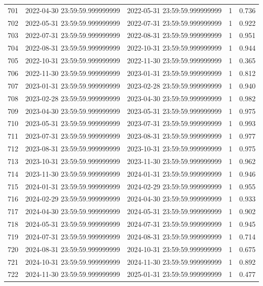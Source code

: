 \begin{table}
\begin{tabular}{lcccc}
701 & 2022-04-30 23:59:59.999999999 & 2022-05-31 23:59:59.999999999 & 1 & 0.736 \\
702 & 2022-05-31 23:59:59.999999999 & 2022-07-31 23:59:59.999999999 & 1 & 0.922 \\
703 & 2022-07-31 23:59:59.999999999 & 2022-08-31 23:59:59.999999999 & 1 & 0.951 \\
704 & 2022-08-31 23:59:59.999999999 & 2022-10-31 23:59:59.999999999 & 1 & 0.944 \\
705 & 2022-10-31 23:59:59.999999999 & 2022-11-30 23:59:59.999999999 & 1 & 0.365 \\
706 & 2022-11-30 23:59:59.999999999 & 2023-01-31 23:59:59.999999999 & 1 & 0.812 \\
707 & 2023-01-31 23:59:59.999999999 & 2023-02-28 23:59:59.999999999 & 1 & 0.940 \\
708 & 2023-02-28 23:59:59.999999999 & 2023-04-30 23:59:59.999999999 & 1 & 0.982 \\
709 & 2023-04-30 23:59:59.999999999 & 2023-05-31 23:59:59.999999999 & 1 & 0.975 \\
710 & 2023-05-31 23:59:59.999999999 & 2023-07-31 23:59:59.999999999 & 1 & 0.993 \\
711 & 2023-07-31 23:59:59.999999999 & 2023-08-31 23:59:59.999999999 & 1 & 0.977 \\
712 & 2023-08-31 23:59:59.999999999 & 2023-10-31 23:59:59.999999999 & 1 & 0.975 \\
713 & 2023-10-31 23:59:59.999999999 & 2023-11-30 23:59:59.999999999 & 1 & 0.962 \\
714 & 2023-11-30 23:59:59.999999999 & 2024-01-31 23:59:59.999999999 & 1 & 0.946 \\
715 & 2024-01-31 23:59:59.999999999 & 2024-02-29 23:59:59.999999999 & 1 & 0.955 \\
716 & 2024-02-29 23:59:59.999999999 & 2024-04-30 23:59:59.999999999 & 1 & 0.933 \\
717 & 2024-04-30 23:59:59.999999999 & 2024-05-31 23:59:59.999999999 & 1 & 0.902 \\
718 & 2024-05-31 23:59:59.999999999 & 2024-07-31 23:59:59.999999999 & 1 & 0.945 \\
719 & 2024-07-31 23:59:59.999999999 & 2024-08-31 23:59:59.999999999 & 1 & 0.714 \\
720 & 2024-08-31 23:59:59.999999999 & 2024-10-31 23:59:59.999999999 & 1 & 0.675 \\
721 & 2024-10-31 23:59:59.999999999 & 2024-11-30 23:59:59.999999999 & 1 & 0.892 \\
722 & 2024-11-30 23:59:59.999999999 & 2025-01-31 23:59:59.999999999 & 1 & 0.477 \\

\end{tabular}
\end{table}
